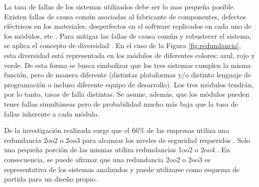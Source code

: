 	La tasa de fallas de los sistemas utilizados debe ser lo mas pequeña posible. Existen fallas de causa común asociadas al fabricante de componentes, defectos eléctricos en los materiales, desperfectos en el software replicados en cada uno de los módulos, etc \cite{Paper_6,Paper_30,Paper_32,Paper_42,Paper_47,Paper_77,Paper_83,Paper_84,Paper_118,Paper_122,Paper_124,Paper_125,Paper_127,Paper_131,Paper_132,Paper_136,Paper_138,Paper_140}. Para mitigar las fallas de causa común y robustecer el sistema, se aplica el concepto de diversidad \cite{Paper_53,Paper_125,Paper_131,Paper_132,Paper_140,Paper_171}. En el caso de la Figura \ref{fig:redundancia}, esta diversidad está representada en los módulos de diferentes colores: azul, rojo y verde. De esta forma se busca simbolizar que los tres sistemas cumplen la misma función, pero de manera diferente (distintas plataformas y/o distinto lenguaje de programación o incluso diferente equipo de desarrollo). Los tres módulos tendrán, por lo tanto, tasas de falla distintas. Se asume, además, que los módulos pueden tener fallas simultáneas pero de probabilidad mucho más baja que la tasa de fallas inherente a cada módulo.
	
	De la investigación realizada surge que el 66\% de las empresas utiliza una redundancia 2oo2 o 2oo3 para alcanzar los niveles de seguridad requeridos \cite{SIEMENS,ALSTOM,HITACHI,THALES,BOMBARDIER,KYOSAN,HIMA,CRRC,CAF,TRANSMASHHOLDING,HYUNDAI,GENERAL,CATERPILLAR,STADLER}. Solo una pequeña porción de las mismas utiliza redundancias 1oo2 \cite{ALSTOM} o 2oo4 \cite{HITACHI}. En consecuencia, se puede afirmar que una redundancia 2oo2 o 2oo3 es representativa de los sistemas analizados y puede utilizarse como esquema de partida para un diseño propio.